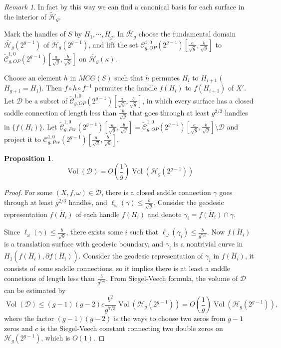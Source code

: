 \documentclass[12pt]{amsart} %
\newtheorem{proposition}[theorem]{Proposition}
\theoremstyle{definition}
\theoremstyle{remark}
\newtheorem{remark}[theorem]{Remark}
\numberwithin{equation}{section}
\renewcommand\H{{\mathcal H}}
\newcommand{\V}{\operatorname{Vol}}
\begin{document}
\begin{remark}
In fact by this way we can find a canonical basis for each surface in the interior of $\tilde{\H}_g$.
\end{remark}

\iffalse
Mark the handles of $S$ by $H_1,\cdots,H_g$. 
In $\tilde{\H_g}$ choose the fundamental domain $\tilde{\H_g}(2^{g-1})$ of $\H_g(2^{g-1})$, and 
lift the set $\mathcal{C}^{1,0}_{g,OP}(2^{g-1})[\frac{a}{\sqrt{g}},\frac{b}{\sqrt{g}}]$ to $\tilde{\mathcal{C}}^{1,0}_{g,OP}(2^{g-1})[\frac{a}{\sqrt{g}},\frac{b}{\sqrt{g}}]$
on $\tilde{\H_g}(\kappa)$.

Choose an element $h$ in $MCG(S)$ such that
$h$ permutes $H_i$ to $H_{i+1}$ ($H_{g+1}=H_1$). Then $f\circ h\circ f^{-1}$ permutes the handle $f(H_i)$ to $f(H_{i+1})$ of $X'$.
Let $\mathcal{D}$ be a subset of $\tilde{\mathcal{C}}^{1,0}_{g,OP}(2^{g-1})[\frac{a}{\sqrt{g}},\frac{b}{\sqrt{g}}]$, 
in which every surface has a closed saddle connection of length less than $\frac{b}{\sqrt{g}}$
that goes through at least $g^{2/3}$ handles in $\{f(H_i)\}$.
Let $\tilde{\mathcal{C}}^{1,0}_{g,Per}(2^{g-1})[\frac{a}{\sqrt{g}},\frac{b}{\sqrt{g}}]=\tilde{\mathcal{C}}^{1,0}_{g,OP}(2^{g-1})[\frac{a}{\sqrt{g}},\frac{b}{\sqrt{g}}]\setminus \mathcal{D}$ and project it to $\mathcal{C}^{1,0}_{g,Per}(2^{g-1})[\frac{a}{\sqrt{g}},\frac{b}{\sqrt{g}}]$.

\begin{proposition}\label{D}
$$\V(\mathcal{D})=O(\frac{1}{g})\V(\H_g(2^{g-1}))$$
\end{proposition}
\begin{proof}
For some $(X,f,\omega)\in \mathcal{D}$, there is a closed saddle connection $\gamma$ goes through at least $g^{2/3}$ handles, and $\ell_\omega(\gamma)\leq \frac{b}{\sqrt{g}}$.
Consider the geodesic representation $\overline{f(H_i)}$ of each handle $f(H_i)$ and denote $\gamma_i=\overline{f(H_i)}\cap \gamma$.

Since $\ell_\omega(\gamma)\leq \frac{b}{\sqrt{g}}$, there exists some $i$ such that $\ell_\omega(\gamma_i)\leq\frac{b}{g^{7/6}}$.
Now $\overline{f(H_i)}$ is a translation surface with geodesic boundary, and $\gamma_i$ is a nontrivial curve in $H_1(\overline{f(H_i)},\partial{\overline{f(H_i)}})$.
Consider the geodesic representation of $\gamma_i$ in $\overline{f(H_i)}$, it consists of some saddle connections, so it implies there is at least a saddle connetions
of length less than $\frac{b}{g^{7/6}}$.
From Siegel-Veech formula, the volume of $\mathcal{D}$ can be estimated by
$$\V(\mathcal{D})\leq (g-1)(g-2)c \frac{b^2}{g^{7/3}} \V(\H_g(2^{g-1}))=O(\frac{1}{g})\V(\H_g(2^{g-1})),$$
where the factor $(g-1)(g-2)$ is the ways to choose two zeros from $g-1$ zeros and 
$c$ is the Siegel-Veech constant connecting two double zeros on $\H_g(2^{g-1})$, which
is $O(1)$.


\end{proof}
\end{document}
